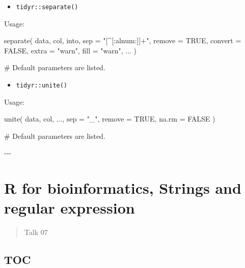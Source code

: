 \documentclass[
]{article}
\newenvironment{Shaded}{}{}
\newcommand{\NormalTok}[1]{#1}
\begin{document}
\begin{itemize}
\item
  \texttt{tidyr::separate()}
\end{itemize}

\begin{Shaded}
\begin{Highlighting}[]
\NormalTok{Usage:}


\NormalTok{separate(}
\NormalTok{  data,}
\NormalTok{  col,}
\NormalTok{  into,}
\NormalTok{  sep = "[\^{}[:alnum:]]+",}
\NormalTok{  remove = TRUE,}
\NormalTok{  convert = FALSE,}
\NormalTok{  extra = "warn",}
\NormalTok{  fill = "warn",}
\NormalTok{  ...}
\NormalTok{)}

\NormalTok{\# Default parameters are listed.}

\end{Highlighting}
\end{Shaded}

\begin{itemize}
\item
  \texttt{tidyr::unite()}
\end{itemize}

\begin{Shaded}
\begin{Highlighting}[]
\NormalTok{Usage:}


\NormalTok{unite(}
\NormalTok{  data,}
\NormalTok{  col, }
\NormalTok{  ..., }
\NormalTok{  sep = "\_", }
\NormalTok{  remove = TRUE, }
\NormalTok{  na.rm = FALSE}
\NormalTok{)}

\NormalTok{\# Default parameters are listed.}


\NormalTok{{-}{-}{-}}
\end{Highlighting}
\end{Shaded}

\hypertarget{r-for-bioinformatics-strings-and-regular-expression}{%
\section{R for bioinformatics, Strings and regular
expression}\label{r-for-bioinformatics-strings-and-regular-expression}}

\begin{quote}
Talk 07
\end{quote}

\hypertarget{toc-3}{%
\subsection{TOC}\label{toc-3}}
\end{document}
